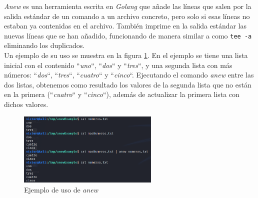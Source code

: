 \textit{Anew}\cite{anew} es una herramienta escrita en \textit{Golang} que añade las líneas que salen por la salida estándar de un comando a un archivo concreto, pero solo si esas líneas no estaban ya contenidas en el archivo. También imprime en la salida estándar las nuevas líneas que se han añadido, funcionando de manera similar a como \texttt{tee -a} eliminando los duplicados.\\

Un ejemplo de su uso se muestra en la figura \ref{fig:anew-example}. En el ejemplo se tiene una lista inicial con el contenido ``\textit{uno}``, ``\textit{dos}`` y ``\textit{tres}``, y una segunda lista con más números: ``\textit{dos}``, ``\textit{tres}``, ``\textit{cuatro}`` y ``\textit{cinco}``. Ejecutando el comando \textit{anew} entre las dos listas, obtenemos como resultado los valores de la segunda lista que no están en la primera (``\textit{cuatro}`` y ``\textit{cinco}``), además de actualizar la primera lista con dichos valores.

\begin{figure}[h]
    \centering
    \includegraphics[width=0.60\textwidth]{images/sections/tools/anew-example.png}
    \caption{Ejemplo de uso de \textit{anew}}
    \label{fig:anew-example}
\end{figure}